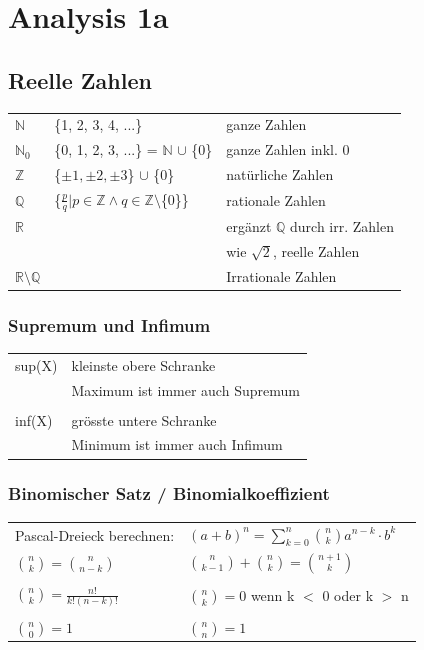 \section{Analysis 1a}

    \subsection{Reelle Zahlen}
	
		\begin{tabular}{l l l}
			$\mathbb{N}$  & \{1, 2, 3, 4, ...\} & ganze Zahlen \\
			$\mathbb{N}_0$ & \{0, 1, 2, 3, ...\} = $\mathbb{N}$ $\cup$ \{0\} & ganze Zahlen inkl. 0 \\
			$\mathbb{Z}$ & \{$\pm1, \pm2, \pm3 $\} $\cup$ \{0\} & natürliche Zahlen \\
			$\mathbb{Q}$ & \{$ \frac{p}{q} | p \in \mathbb{Z} \wedge q \in \mathbb{Z} \setminus $\{0\}\} & rationale Zahlen \\
			$\mathbb{R}$ & & ergänzt $\mathbb{Q}$ durch irr. Zahlen \\
			             & & wie $\sqrt{2}$, reelle Zahlen \\
			$\mathbb{R} \setminus \mathbb{Q}$ & & Irrationale Zahlen \\
		\end{tabular}

		\subsubsection{Supremum und Infimum}
			\begin{tabular}{ll} 
				sup(X) & kleinste obere Schranke  \\
				       & Maximum ist immer auch Supremum \\
				\\
				inf(X) &  grösste untere Schranke \\ 
				       & Minimum ist immer auch Infimum \\
			\end{tabular}			
				
		\subsubsection{Binomischer Satz / Binomialkoeffizient}	
			\begin{tabular}{ll} 
				Pascal-Dreieck berechnen:  & $\left(a+b\right)^n = \sum\limits _{k=0}^n \binom{n}{k}a^{n-k}\cdot b^k$ \\
				$\binom{n}{k}=\binom{n}{n-k}$ & $\binom{n}{k-1}+\binom{n}{k}=\binom{n+1}{k}$ \\
				\\
				$\binom{n}{k}=\frac{n!}{k!\left(n-k\right)!}$ & $\binom{n}{k} = 0$ wenn k $<$ 0 oder k $>$ n \\ 
				\\
				$\binom{n}{0}=1$ &  $\binom{n}{n}=1$ \\ 	 		
			\end{tabular}				 
				 
